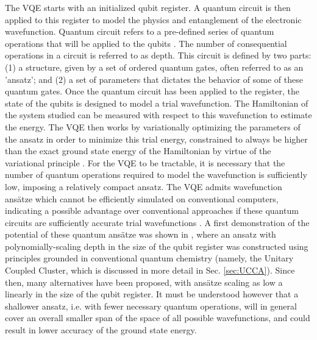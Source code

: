The VQE starts with an initialized qubit register. A quantum circuit is then applied to this register to model the physics and entanglement of the electronic wavefunction. Quantum circuit refers to a pre-defined series of quantum operations that will be applied to the qubits \cite{nielsenQuantumComputationQuantum2010}. The number of consequential operations in a circuit is referred to as depth. This circuit is defined by two parts: (1) a structure, given by a set of ordered quantum gates, often referred to as an 'ansatz'; and (2) a set of parameters that dictates the behavior of some of these quantum gates. Once the quantum circuit has been applied to the register, the state of the qubits is designed to model a trial wavefunction. The Hamiltonian of the system studied can be measured with respect to this wavefunction to estimate the energy. The VQE then works by variationally optimizing the parameters of the ansatz in order to minimize this trial energy, constrained to always be higher than the exact ground state energy of the Hamiltonian by virtue of the variational principle \cite{Rayleigh1870, Ritz1908, Arfken1985}. For the VQE to be tractable, it is necessary that the number of quantum operations required to model the wavefunction is sufficiently low, imposing a relatively compact ansatz. The VQE admits wavefunction ans\"atze which cannot be efficiently simulated on conventional computers, indicating a possible advantage over conventional approaches if these quantum circuits are sufficiently accurate trial wavefunctions \cite{Peruzzo2014}. A first demonstration of the potential of these quantum ans\"atze was shown in \cite{Peruzzo2014}, where an ansatz with polynomially-scaling depth in the size of the qubit register was constructed using principles grounded in conventional quantum chemistry (namely, the Unitary Coupled Cluster, which is discussed in more detail in Sec. \ref{sec:UCCA}). Since then, many alternatives have been proposed, with ans{\"{a}}tze scaling as low a linearly \cite{Lee2019} in the size of the qubit register. It must be understood however that a shallower ansatz, i.e. with fewer necessary quantum operations, will in general cover an overall smaller span of the space of all possible wavefunctions, and could result in lower accuracy of the ground state energy.

